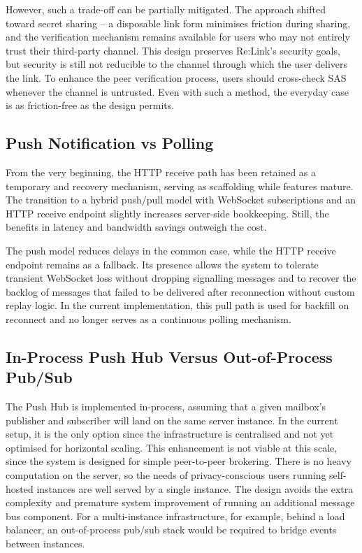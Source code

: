 \documentclass[12pt,a4paper,oneside]{report}
\begin{document}
However, such a trade-off can be partially mitigated. The approach shifted toward secret sharing -- a disposable link form minimises friction during sharing, and the verification mechanism remains available for users who may not entirely trust their third-party channel. This design preserves Re:Link's security goals, but security is still not reducible to the channel through which the user delivers the link. To enhance the peer verification process, users should cross-check SAS whenever the channel is untrusted. Even with such a method, the everyday case is as friction-free as the design permits.


\subsection{Push Notification vs Polling}
\label{sec:push-vs-polling}

From the very beginning, the HTTP receive path has been retained as a temporary and recovery mechanism, serving as scaffolding while features mature. The transition to a hybrid push/pull model with WebSocket subscriptions and an HTTP receive endpoint slightly increases server-side bookkeeping. Still, the benefits in latency and bandwidth savings outweigh the cost.

The push model reduces delays in the common case, while the HTTP receive endpoint remains as a fallback. Its presence allows the system to tolerate transient WebSocket loss without dropping signalling messages and to recover the backlog of messages that failed to be delivered after reconnection without custom replay logic. In the current implementation, this pull path is used for backfill on reconnect and no longer serves as a continuous polling mechanism.


\subsection{In-Process Push Hub Versus Out-of-Process Pub/Sub}
\label{sec:push-hub}

The Push Hub is implemented in-process, assuming that a given mailbox's publisher and subscriber will land on the same server instance. In the current setup, it is the only option since the infrastructure is centralised and not yet optimised for horizontal scaling. This enhancement is not viable at this scale, since the system is designed for simple peer-to-peer brokering. There is no heavy computation on the server, so the needs of privacy-conscious users running self-hosted instances are well served by a single instance. The design avoids the extra complexity and premature system improvement of running an additional message bus component. For a multi-instance infrastructure, for example, behind a load balancer, an out-of-process pub/sub stack would be required to bridge events between instances.
\end{document}
